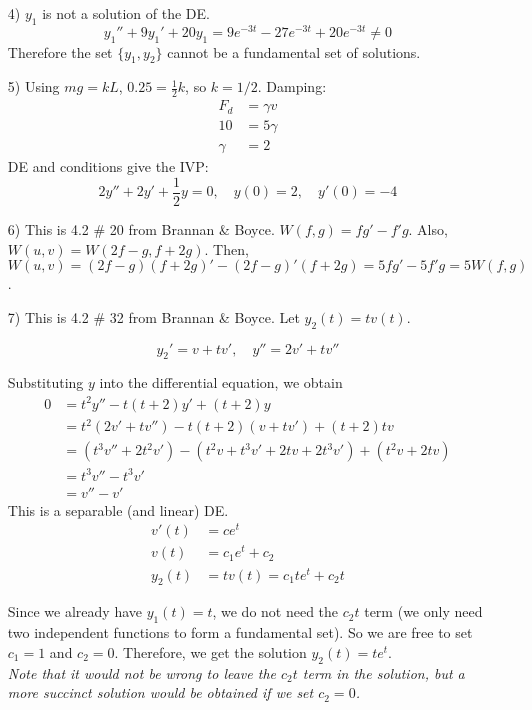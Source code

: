 \documentclass[12pt]{exam}
\begin{document}
\begin{enumerate}

\item[4)] $y_1$ is not a solution of the DE. $$y_1''+9y_1' +20y_1 = 9e^{-3t}-27e^{-3t}+20e^{-3t} \ne 0$$ Therefore the set $\{y_1,y_2\}$ cannot be a fundamental set of solutions. 
\item[5)] Using $mg = kL$, $0.25 = \frac 12 k$, so $k = 1/2$. Damping: \begin{align*}F_d &= \gamma v \\ 10&=5 \gamma  \\
\gamma &= 2\end{align*}
DE and conditions give the IVP: 
$$2y'' +2y' + \frac 12 y = 0, \quad y(0) = 2, \quad y'(0) = -4$$ 
\item[6)] This is 4.2 \# 20 from Brannan \& Boyce. $W(f,g) = fg' - f'g$. Also, $W(u,v) = W(2f - g,f + 2g) $. Then, $W(u,v) =(2f-g)(f+2g)'
 - (2f- g)'(f+2g)= 5fg' - 5f'g = 5W(f,g)$. 

\item[7)] This is 4.2 \# 32 from Brannan \& Boyce. Let $y_2(t) = tv(t)$. 

$$y_2' = v + tv', \quad y'' = 2v' + tv''$$

Substituting $y$ into the differential equation, we obtain 
\begin{align*}
    0 &= t^2y'' - t(t+2)y' + (t+2)y \\
    &= t^2(2v' + tv'') - t(t+2)(v + tv') + (t+2)tv \\
    &= (t^3v'' +2t^2v') - ( t^2v + t^3v' + 2tv + 2t^3v') + (t^2v+2tv) \\
    &= t^3v'' - t^3 v' \\
    &= v'' - v'
\end{align*}
This is a separable (and linear) DE. 
\begin{align*}
    v'(t) &= ce^t \\
    v(t) &= c_1 e^t + c_2 \\
    y_2(t) &= tv(t) = c_1te^t + c_2t
\end{align*}

Since we already have $y_1(t) = t$, we do not need the $c_2t$ term (we only need two independent functions to form a fundamental set). So we are free to set $c_1 = 1$ and $c_2 = 0$. Therefore, we get the solution $y_2(t) = te^t$. \\[12pt] \textit{Note that it would not be wrong to leave the $c_2t$ term in the solution, but a more succinct solution would be obtained if we set $c_2 = 0$. }
\end{enumerate} 
\end{document}
